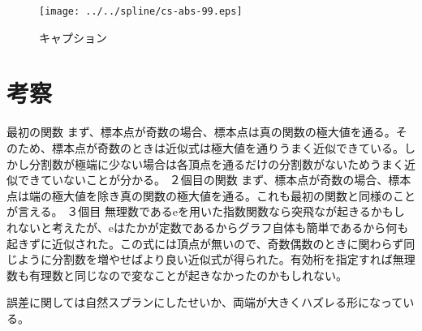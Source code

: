 \documentclass[titlepage, a4paper, 11pt, dvipdfmx]{jsarticle}
\begin{document}
\begin{figure}[H]
  \begin{center}%
    \texttt{[image: ../../spline/cs-abs-99.eps]}%
  \caption{キャプション}
  \label{Label}%
  \end{center}
\end{figure}


\section{考察}
最初の関数
まず、標本点が奇数の場合、標本点は真の関数の極大値を通る。そのため、標本点が奇数のときは近似式は極大値を通りうまく近似できている。しかし分割数が極端に少ない場合は各頂点を通るだけの分割数がないためうまく近似できていないことが分かる。
２個目の関数
まず、標本点が奇数の場合、標本点は端の極大値を除き真の関数の極大値を通る。これも最初の関数と同様のことが言える。
３個目
無理数であるeを用いた指数関数なら突飛なが起きるかもしれないと考えたが、eはたかが定数であるからグラフ自体も簡単であるから何も起きずに近似された。この式には頂点が無いので、奇数偶数のときに関わらず同じように分割数を増やせばより良い近似式が得られた。有効桁を指定すれば無理数も有理数と同じなので変なことが起きなかったのかもしれない。

誤差に関しては自然スプランにしたせいか、両端が大きくハズレる形になっている。
\end{document}
